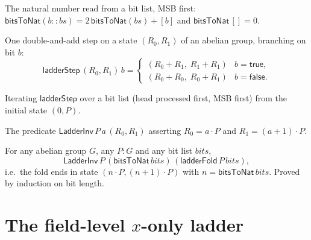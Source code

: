\begin{definition}
  \label{def:bits-to-nat}
  \leanok
  The natural number read from a bit list, MSB first:
  $\mathsf{bitsToNat}(b::bs) = 2\,\mathsf{bitsToNat}(bs) + [b]$ and
  $\mathsf{bitsToNat}\,[] = 0$.
\end{definition}

\begin{definition}
  \label{def:ladder-step}
  \leanok
  One double-and-add step on a state $(R_0, R_1)$ of an abelian group,
  branching on bit $b$:
  \[
    \mathsf{ladderStep}\,(R_0,R_1)\,b =
      \begin{cases}
        (R_0 + R_1,\; R_1 + R_1) & b = \mathsf{true},\\
        (R_0 + R_0,\; R_0 + R_1) & b = \mathsf{false}.
      \end{cases}
  \]
\end{definition}

\begin{definition}
  \label{def:ladder-fold}
  \leanok
  Iterating $\mathsf{ladderStep}$ over a bit list (head processed first,
  MSB first) from the initial state $(0, P)$.
\end{definition}

\begin{definition}
  \label{def:ladder-inv}
  \leanok
  The predicate $\mathsf{LadderInv}\,P\,a\,(R_0,R_1)$ asserting
  $R_0 = a \cdot P$ and $R_1 = (a+1)\cdot P$.
\end{definition}

\begin{theorem}
  \label{thm:ladder-fold-correct}
  \leanok
  For any abelian group $G$, any $P : G$ and any bit list $bits$,
  \[
    \mathsf{LadderInv}\,P\,(\mathsf{bitsToNat}\,bits)\,
      (\mathsf{ladderFold}\,P\,bits),
  \]
  i.e.\ the fold ends in state $(n\cdot P, (n+1)\cdot P)$ with
  $n = \mathsf{bitsToNat}\,bits$. Proved by induction on bit length.
\end{theorem}

\section{The field-level \texorpdfstring{$x$}{x}-only ladder}

